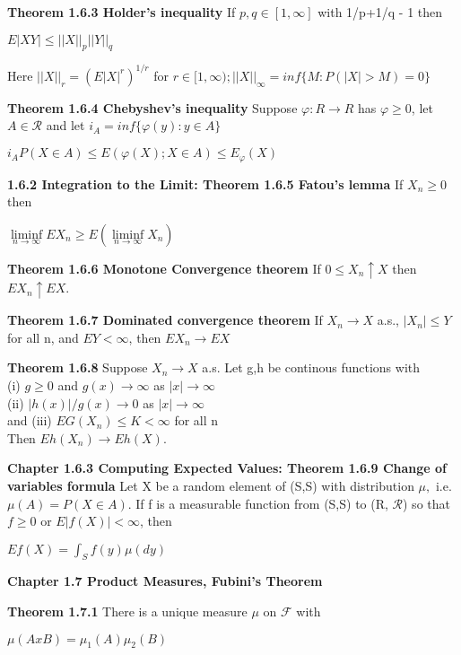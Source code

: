 \documentclass{article}
\begin{document}
\textbf {Theorem 1.6.3 Holder's inequality} If $p,q \in [1, \infty]$ with 1/p+1/q - 1 then
\begin{center}
$E|XY| \leq ||X||_p ||Y||_q$
\end{center}
Here $||X||_r = (E|X|^r)^{1/r}$ for $r \in [1, \infty); ||X||_{\infty} = inf \{M: P(|X| > M) = 0\}$

\textbf {Theorem 1.6.4 Chebyshev's inequality} Suppose $\varphi: R \rightarrow R$ has $\varphi \geq 0$, let $A \in \mathcal{R}$ and let $i_A = inf \{ \varphi (y) : y \in A \}$
\begin{center}
$i_A P(X \in A) \leq E(\varphi(X); X \in A) \leq E_{\varphi} (X)$
\end{center}

\textbf {1.6.2 Integration to the Limit: Theorem 1.6.5 Fatou's lemma} If $X_n \geq 0$ then
\begin{center}
$\liminf\limits_{n \to \infty} EX_n \geq E(\liminf\limits_{n \to \infty} X_n)$
\end{center}

\textbf {Theorem 1.6.6 Monotone Convergence theorem} If $0 \leq X_n \uparrow X$ then $EX_n \uparrow EX$.

\textbf {Theorem 1.6.7 Dominated convergence theorem} If $X_n \rightarrow X$ a.s., $|X_n| \leq Y$ for all n, and $EY < \infty$, then $EX_n \rightarrow EX$

\textbf {Theorem 1.6.8} Suppose $X_n \rightarrow X$ a.s. Let g,h be continous functions with
\\ (i) $g \geq 0$ and $g(x) \rightarrow \infty$ as $|x| \rightarrow \infty$ \\
(ii) $|h(x)|/g(x) \rightarrow 0$ as $|x| \rightarrow \infty$ \\
and (iii) $EG(X_n) \leq K < \infty$ for all n\\
Then $Eh(X_n) \rightarrow Eh(X).$ 

\textbf {Chapter 1.6.3 Computing Expected Values: Theorem 1.6.9 Change of variables formula} Let X be a random element of (S,S) with distribution  $\mu, $ i.e. $\mu(A) = P(X \in A)$. If f is a measurable function from (S,S) to (R, $\mathcal{R}$) so that $f \geq 0$ or $E|f(X)| < \infty$, then 
\begin{center}
$Ef(X) = \int_{S} f(y) \mu(dy)$
\end{center}

\textbf {Chapter 1.7 Product Measures, Fubini's Theorem}

\textbf {Theorem 1.7.1} There is a unique measure $\mu$ on $\mathcal{F}$ with
\begin{center}
$\mu(A x B) = \mu_1 (A) \mu_2 (B)$
\end{center}
\end{document}
